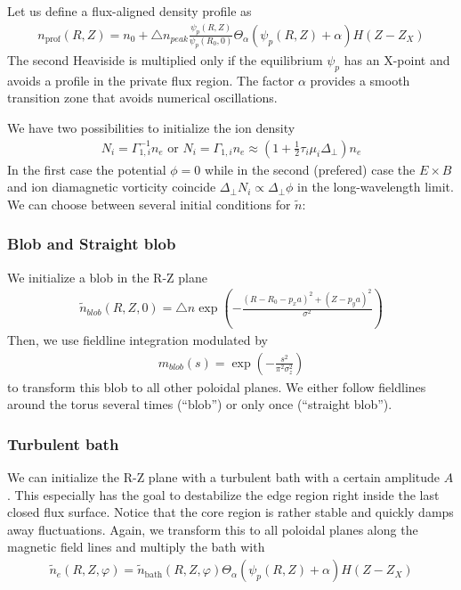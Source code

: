 Let us define a flux-aligned density profile as
\begin{align} \label{eq:density_profile}
  n_{\text{prof}}(R,Z)=
      n_0 + \triangle n_{peak}\frac{\psi_p(R,Z) }{\psi_p(R_0,0)}\Theta_{\alpha}(\psi_p(R, Z)+\alpha) H(Z-Z_X)
\end{align}
The second Heaviside is multiplied only if the equilibrium $\psi_p$ has an
X-point and avoids a profile in the private flux region. The factor $\alpha$ provides a smooth transition
zone that avoids numerical oscillations.


We have two possibilities to initialize the ion density
\begin{align} \label{eq:initphi}
  N_i = \Gamma_{1,i}^{-1} n_e \text{ or } N_i = \Gamma_{1,i}n_e\approx \left(1+\frac{1}{2}\tau_i\mu_i\Delta_\perp\right)n_e
\end{align}
In the first case the potential $\phi= 0$ while in the second (prefered)
case
the $E\times B$ and ion diamagnetic vorticity coincide $\Delta_\perp N_i \propto \Delta_\perp \phi$ in the long-wavelength limit.
We can choose between several initial conditions for $\tilde n$:

\subsubsection{Blob and Straight blob}
We initialize a blob in the R-Z plane
\begin{align} \label{eq:initial_blob}
  \tilde n_{blob}(R,Z,0) = \triangle n \exp\left( -\frac{(R - R_0 - p_x a)^2 + (Z-p_ya)^2}{\sigma^2} \right)
\end{align}
Then, we use fieldline integration modulated by 
\begin{align}
  m_{blob}(s) = \exp\left( -\frac{s^2 }{\pi^2\sigma_z^2} \right)
\end{align}
to transform this blob to all other poloidal
planes.
We either follow fieldlines around the torus several times (``blob'') or only once
(``straight blob'').
\subsubsection{Turbulent bath}
We can initialize the R-Z plane with a turbulent bath with a certain amplitude $A$.
This especially has the goal to destabilize the edge region right inside the
last closed flux surface. Notice that the core region is rather stable
and quickly damps away fluctuations.
Again, we transform this to all poloidal planes along the magnetic field lines and multiply the bath with
\begin{align} \label{eq:initial_turbulent}
\tilde n_e(R,Z,\varphi) = \tilde n_{\text{bath}}(R,Z,\varphi)\Theta_{\alpha}(\psi_p(R, Z)+\alpha) H(Z-Z_X)
\end{align}
